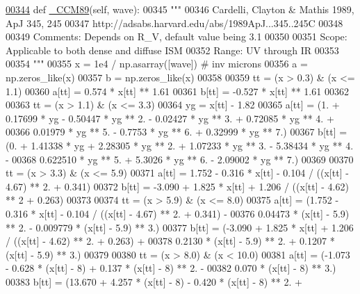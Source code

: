 \begin{DoxyVerb}
\begin{DoxyCode}
\hypertarget{classpyneb_1_1extinction_1_1red__corr_1_1_red_corr_l00344}{}\hyperlink{classpyneb_1_1extinction_1_1red__corr_1_1_red_corr_a51dd4794e0a4f7f02382f424cad7e0f9}{00344}     \textcolor{keyword}{def }\hyperlink{classpyneb_1_1extinction_1_1red__corr_1_1_red_corr_a51dd4794e0a4f7f02382f424cad7e0f9}{\_CCM89}(self, wave):
00345         \textcolor{stringliteral}{"""}
00346 \textcolor{stringliteral}{        Cardelli, Clayton & Mathis 1989, ApJ 345, 245}
00347 \textcolor{stringliteral}{        http://adsabs.harvard.edu/abs/1989ApJ...345..245C}
00348 \textcolor{stringliteral}{}
00349 \textcolor{stringliteral}{        Comments: Depends on R\_V, default value being 3.1}
00350 \textcolor{stringliteral}{}
00351 \textcolor{stringliteral}{        Scope: Applicable to both dense and diffuse ISM}
00352 \textcolor{stringliteral}{        Range: UV through IR}
00353 \textcolor{stringliteral}{        }
00354 \textcolor{stringliteral}{        """}
00355         x = 1e4 / np.asarray([wave]) \textcolor{comment}{# inv microns}
00356         a = np.zeros\_like(x)
00357         b = np.zeros\_like(x)
00358         
00359         tt = (x > 0.3) & (x <= 1.1)
00360         a[tt] = 0.574 * x[tt] ** 1.61 
00361         b[tt] = -0.527 * x[tt] ** 1.61
00362     
00363         tt = (x > 1.1) & (x <= 3.3)
00364         yg = x[tt] - 1.82
00365         a[tt] = (1. + 0.17699 * yg - 0.50447 * yg ** 2. - 0.02427 * yg ** 3. + 0.72085 * yg ** 4. + 
00366                  0.01979 * yg ** 5. - 0.7753 * yg ** 6. + 0.32999 * yg ** 7.)
00367         b[tt] = (0. + 1.41338 * yg + 2.28305 * yg ** 2. + 1.07233 * yg ** 3. - 5.38434 * yg ** 4. - 
00368                  0.622510 * yg ** 5. + 5.3026 * yg ** 6. - 2.09002 * yg ** 7.)
00369         
00370         tt = (x > 3.3) & (x <= 5.9)
00371         a[tt] = 1.752 - 0.316 * x[tt] - 0.104 / ((x[tt] - 4.67) ** 2. + 0.341)
00372         b[tt] = -3.090 + 1.825 * x[tt] + 1.206 / ((x[tt] - 4.62) ** 2 + 0.263)
00373         
00374         tt = (x > 5.9) & (x <= 8.0)
00375         a[tt] = (1.752 - 0.316 * x[tt] - 0.104 / ((x[tt] - 4.67) ** 2. + 0.341) - 
00376                  0.04473 * (x[tt] - 5.9) ** 2. - 0.009779 * (x[tt] - 5.9) ** 3.)
00377         b[tt] = (-3.090 + 1.825 * x[tt] + 1.206 / ((x[tt] - 4.62) ** 2. + 0.263) + 
00378                  0.2130 * (x[tt] - 5.9) ** 2. + 0.1207 * (x[tt] - 5.9) ** 3.)
00379         
00380         tt = (x > 8.0) & (x < 10.0)
00381         a[tt] = (-1.073 - 0.628 * (x[tt] - 8) + 0.137 * (x[tt] - 8) ** 2. - 
00382                  0.070 * (x[tt] - 8) ** 3.)
00383         b[tt] = (13.670 + 4.257 * (x[tt] - 8) - 0.420 * (x[tt] - 8) ** 2. + 

\end{DoxyCode}
\end{DoxyVerb}

